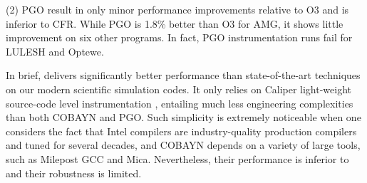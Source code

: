 \noindent (2) PGO result in only minor performance improvements
relative to O3 and is inferior to \toolname CFR.  While PGO is 1.8\%
better than O3 for AMG, it shows little improvement on six other
programs.  In fact, PGO instrumentation runs fail for LULESH and
Optewe. 

In brief, \toolname delivers significantly better performance than
state-of-the-art techniques on our modern scientific simulation codes.
It only relies on Caliper light-weight source-code level
instrumentation \cite{caliper}, entailing much less engineering
complexities than both COBAYN and PGO.  Such simplicity is extremely
noticeable when one considers the fact that Intel compilers are
industry-quality production compilers and tuned for several decades,
and COBAYN depends on a variety of large tools, such as Milepost GCC
\cite{milepostgcc} and Mica.  Nevertheless, their performance is
inferior to \toolname and their robustness is limited.

